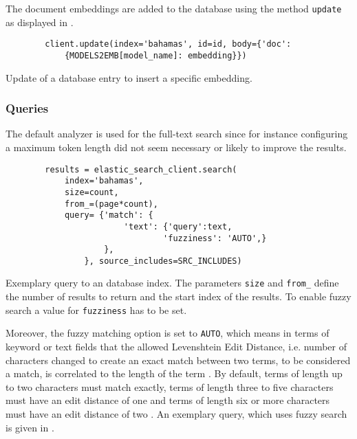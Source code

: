 The document embeddings are added to the database using the method \texttt{update} as displayed in .

\begin{listing}[htp]
    \begin{verbatim}
        client.update(index='bahamas', id=id, body={'doc': 
            {MODELS2EMB[model_name]: embedding}})
    \end{verbatim}
    \caption[Update of a database entry]
    {Update of a database entry to insert a specific embedding.
    }
    \label{lst:db_Pool_update}
\end{listing}


\subsubsection*{Queries}
The default analyzer is used for the full-text search since for instance configuring a maximum token length did not seem necessary or likely to improve the results.

\begin{listing}[htp]
    \begin{verbatim}
        results = elastic_search_client.search(
            index='bahamas', 
            size=count,
            from_=(page*count),
            query= {'match': {
                        'text': {'query':text,
                                'fuzziness': 'AUTO',}
                    }, 
                }, source_includes=SRC_INCLUDES)
    \end{verbatim}
    \caption[Query to an \databaseName{} database index]{Exemplary query to an \databaseName{} database index.
    The parameters \texttt{size} and \texttt{from\_} define the number of results to return and the start index of the results.
    To enable fuzzy search a value for \texttt{fuzziness} has to be set. 
    }
    \label{lst:fuzzy_query}
\end{listing}

Moreover, the fuzzy matching option is set to \texttt{AUTO}, which means in terms of keyword or text fields that the allowed Levenshtein Edit Distance, 
i.e. number of characters changed to create an exact match between two terms, to be considered a match, is correlated to the length of the term \cite{Elasticsearch-fuzziness}.
By default, terms of length up to two characters must match exactly, terms of length three to five characters must have an edit distance of one and 
terms of length six or more characters must have an edit distance of two \cite{Elasticsearch-fuzziness}.
An exemplary query, which uses fuzzy search is given in .

